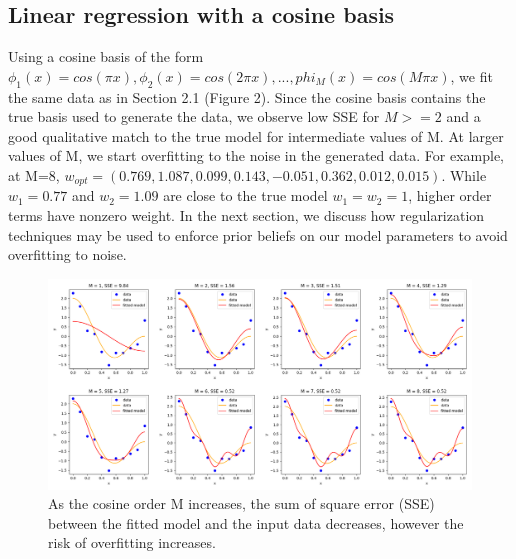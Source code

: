 \documentclass[10pt]{article}
\begin{document}

\subsection{Linear regression with a cosine basis}

Using a cosine basis of the form $\phi_1(x) = cos(\pi x), \phi_2(x) = cos(2\pi x), ... , phi_M(x) = cos(M\pi x)$, we fit the same data as in Section 2.1 (Figure 2). Since the cosine basis contains the true basis used to generate the data, we observe low SSE for $M>=2$ and a good qualitative match to the true model for intermediate values of M. At larger values of M, we start overfitting to the noise in the generated data. For example, at M=8, $w_{opt} =  (0.769, 1.087, 0.099, 0.143, -0.051, 0.362, 0.012, 0.015) $. While $w_1=0.77$ and $w_2=1.09$ are close to the true model $w_1 = w_2 = 1$, higher order terms have nonzero weight. In the next section, we discuss how regularization techniques may be used to enforce prior beliefs on our model parameters to avoid overfitting to noise.

\begin{figure}
\caption{As the cosine order M increases, the sum of square error (SSE) between the fitted model and the input data decreases, however the risk of overfitting increases.}
\begin{center}
\includegraphics[width=450px]{all_regress_cos}
\end{center}
\end{figure}
\end{document}
